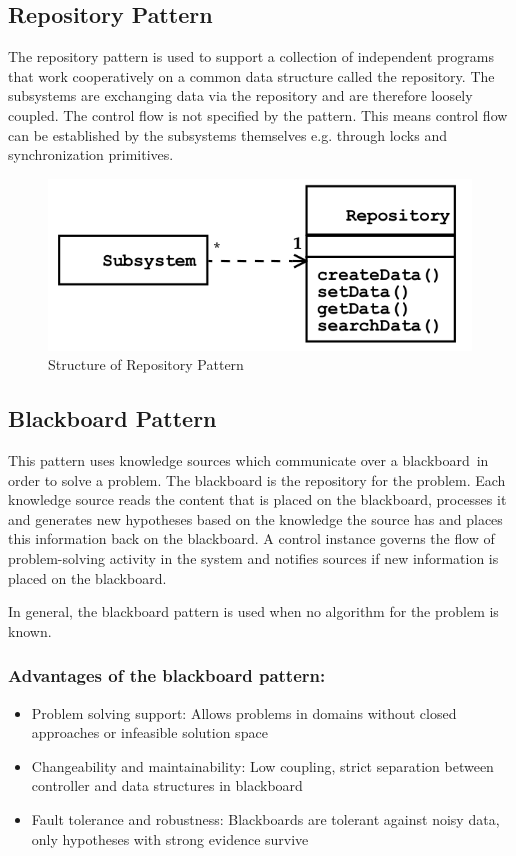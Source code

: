 \subsection{Repository Pattern}
The repository pattern is used to support a collection of independent programs that work cooperatively on a common data structure called the repository.
The subsystems are exchanging data via the repository and are therefore loosely coupled.
The control flow is not specified by the pattern.
This means control flow can be established by the subsystems themselves e.g. through
locks and synchronization primitives.\newline
\begin{figure}[h]
	\centering
	\includegraphics[width=0.7\linewidth]{images/pattern_repository.png}
	\caption{Structure of Repository Pattern}
\end{figure}
\newpage


\subsection{Blackboard Pattern}
This pattern uses knowledge sources which communicate over a \glqq blackboard\grqq \ in order to solve a problem.
The blackboard is the repository for the problem.
Each knowledge source reads the content that is placed on the blackboard, processes it and generates new hypotheses based on the knowledge the source has and places this information back on the blackboard.
A control instance governs the flow of problem-solving activity in the system and notifies sources if new information is placed on the blackboard.

In general, the blackboard pattern is used when no algorithm for the problem is known.

\subsubsection*{Advantages of the blackboard pattern:}
\begin{itemize}
	\item Problem solving support:
		\subitem Allows problems in domains without closed approaches or infeasible solution space
	\item Changeability and maintainability:
		\subitem Low coupling, strict separation between controller	and data structures in blackboard
	\item Fault tolerance and robustness:
		\subitem Blackboards  are tolerant against noisy data, only hypotheses with strong evidence survive
\end{itemize}

